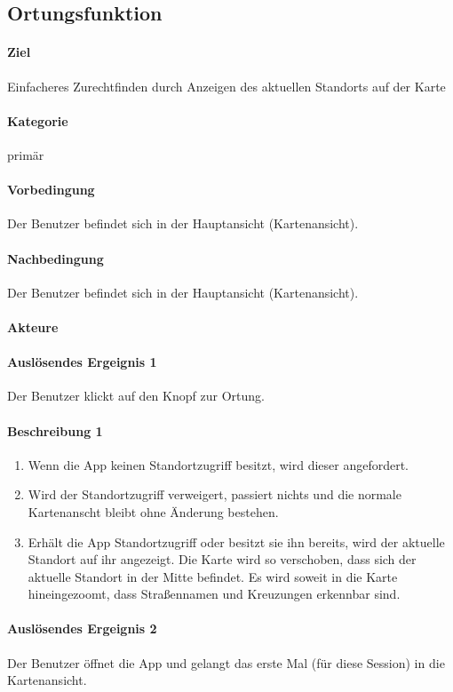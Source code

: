 \subsection{Ortungsfunktion}
\label{Ortungsfunktion}
\paragraph{Ziel}
Einfacheres Zurechtfinden durch Anzeigen des aktuellen Standorts auf der Karte
\paragraph{Kategorie}
primär
\paragraph{Vorbedingung}
Der Benutzer befindet sich in der Hauptansicht (Kartenansicht).
\paragraph{Nachbedingung}
Der Benutzer befindet sich in der Hauptansicht (Kartenansicht).
\paragraph{Akteure}

\paragraph{Auslösendes Ergeignis 1}
Der Benutzer klickt auf den Knopf zur Ortung.
\paragraph{Beschreibung 1}
\begin{enumerate}
    \item Wenn die App keinen Standortzugriff besitzt, wird dieser angefordert.
    \item Wird der Standortzugriff verweigert, passiert nichts und die normale Kartenanscht bleibt ohne Änderung bestehen.
    \item Erhält die App Standortzugriff oder besitzt sie ihn bereits, wird der aktuelle Standort auf ihr angezeigt. Die Karte wird so verschoben, dass sich der aktuelle Standort in der Mitte befindet. Es wird soweit in die Karte hineingezoomt, dass Straßennamen und Kreuzungen erkennbar sind.
\end{enumerate}

\paragraph{Auslösendes Ergeignis 2}
Der Benutzer öffnet die App und gelangt das erste Mal (für diese Session) in die Kartenansicht.
